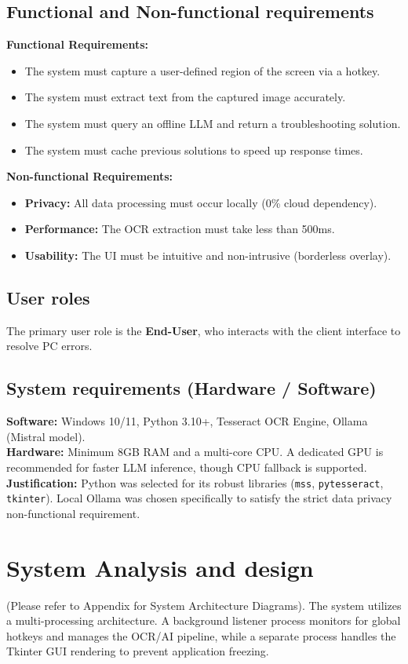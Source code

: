 \documentclass[12pt,a4paper]{report}
\begin{document}
\subsection{Functional and Non-functional requirements}
\textbf{Functional Requirements:}
\begin{itemize}
    \item The system must capture a user-defined region of the screen via a hotkey.
    \item The system must extract text from the captured image accurately.
    \item The system must query an offline LLM and return a troubleshooting solution.
    \item The system must cache previous solutions to speed up response times.
\end{itemize}
\textbf{Non-functional Requirements:}
\begin{itemize}
    \item \textbf{Privacy:} All data processing must occur locally (0\% cloud dependency).
    \item \textbf{Performance:} The OCR extraction must take less than 500ms.
    \item \textbf{Usability:} The UI must be intuitive and non-intrusive (borderless overlay).
\end{itemize}

\subsection{User roles}
The primary user role is the \textbf{End-User}, who interacts with the client interface to resolve PC errors.

\subsection{System requirements (Hardware / Software)}
\textbf{Software:} Windows 10/11, Python 3.10+, Tesseract OCR Engine, Ollama (Mistral model). \\
\textbf{Hardware:} Minimum 8GB RAM and a multi-core CPU. A dedicated GPU is recommended for faster LLM inference, though CPU fallback is supported. \\
\textbf{Justification:} Python was selected for its robust libraries (\texttt{mss}, \texttt{pytesseract}, \texttt{tkinter}). Local Ollama was chosen specifically to satisfy the strict data privacy non-functional requirement.

\section{System Analysis and design}
(Please refer to Appendix for System Architecture Diagrams). The system utilizes a multi-processing architecture. A background listener process monitors for global hotkeys and manages the OCR/AI pipeline, while a separate process handles the Tkinter GUI rendering to prevent application freezing.
\end{document}
